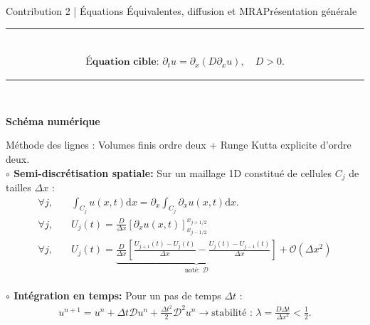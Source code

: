 \begin{frame}{Contribution 2 | Équations Équivalentes, diffusion et MRA}{Présentation générale}
    \footnotesize
    \noindent\color{Primary}\rule{\linewidth}{0.6pt}\color{black}\\
        {\large\begin{align}\textbf{Équation cible: } \partial_t u = \partial_x \left( D \partial_{x}u \right), \quad D > 0.\end{align}}
    \noindent\color{Primary}\rule{\linewidth}{0.6pt}\color{black}\\
    \begin{center}\large\textbf{Schéma numérique}\end{center}
        Méthode des lignes : Volumes finis ordre deux + Runge Kutta explicite d'ordre deux.\\
        \textbf{$\circ$ Semi-discrétisation spatiale:} Sur un maillage 1D constitué de cellules $C_j$ de tailles $\Delta x$ : 
            \begin{align}
                \forall j,\quad &\int_{C_j} u(x,t) \mathrm d x = \partial_x \int_{C_j} \partial_x u(x,t) \mathrm d x.\\
                \forall j,\quad &U_j(t) = \frac{D}{\Delta x} \left[\partial_x u(x,t)\right]^{x_{j+1/2}}_{x_{j-1/2}}\\
                \forall j,\quad &U_j(t) = \underbrace{\frac{D}{\Delta x} \left[
                    \frac{U_{j+1}(t) - U_{j}(t)}{\Delta x} - \frac{U_{j}(t) - U_{j-1}(t)}{\Delta x}
                \right]}_{\text{noté: } \mathcal D}+ \mathcal O(\Delta x^2)
            \end{align}\\
        \textbf{$\circ$ Intégration en temps:} Pour un pas de temps $\Delta t$ : 
        \begin{align}
            u^{n+1} = u^n + \Delta t \mathcal D u^n + \frac{\Delta t^2}{2} \mathcal D^2 u^n \rightarrow \text{stabilité : }\lambda = \frac{D \Delta t}{\Delta x^2} < \frac{1}{2}.
        \end{align}
\end{frame}